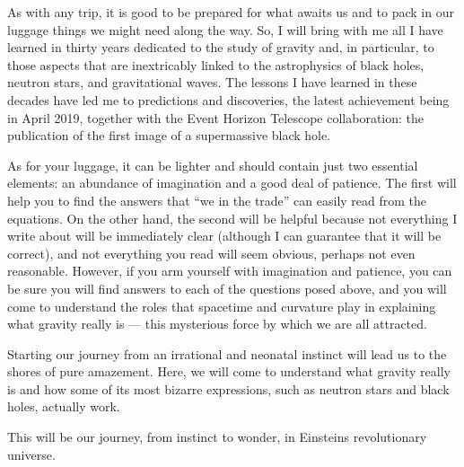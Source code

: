 As with any trip, it is good to be prepared for what awaits us and to pack in our
luggage things we might need along the way. So, I will bring with me all I have learned
in thirty years dedicated to the study of gravity and, in particular, to those aspects
that are inextricably linked to the astrophysics of black holes, neutron stars, and
gravitational waves. The lessons I have learned in these decades have led me to
predictions and discoveries, the latest achievement being in April 2019, together with
the Event Horizon Telescope collaboration: the publication of the first image of a
supermassive black hole.

As for your luggage, it can be lighter and should contain just two essential elements:
an abundance of imagination and a good deal of patience. The first will help you to find
the answers that ``we in the trade'' can easily read from the equations. On the other
hand, the second will be helpful because not everything I write about will be
immediately clear (although I can guarantee that it will be correct), and not everything
you read will seem obvious, perhaps not even reasonable. However, if you arm yourself
with imagination and patience, you can be sure you will find answers to each of the
questions posed above, and you will come to understand the roles that spacetime and
curvature play in explaining what gravity really is --- this mysterious force by which
we are all attracted.

Starting our journey from an irrational and neonatal instinct will lead us to the shores
of pure amazement. Here, we will come to understand what gravity really is and how some
of its most bizarre expressions, such as neutron stars and black holes, actually work.

This will be our journey, from instinct to wonder, in Einstein\textquotesingle s
revolutionary universe.
